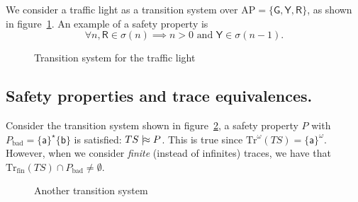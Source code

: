 \documentclass[./main]{subfiles}
\begin{document}
  \begin{exm}
    We consider a traffic light as a transition system over $\mathrm{AP} = \{\mathsf{G}, \mathsf{Y}, \mathsf{R}\}$, as shown in figure~\ref{fig:traffic-light}.
    An example of a safety property is
    \[
    \forall n, \mathsf{R} \in \sigma(n) \implies n > 0 \text{ and } \mathsf{Y} \in \sigma(n-1)
    .\] 
  \end{exm}

  \begin{figure}[b]
    \centering
    \caption{Transition system for the traffic light}
    \label{fig:traffic-light}
  \end{figure}

  \subsection{Safety properties and trace equivalences.}

  \begin{exm}
    \label{exm:two-states-ts}
    Consider the transition system shown in figure~\ref{fig:two-states-ts}, a safety property $P$ with $P_\mathrm{bad} = \{\mathsf{a}\}^\star \{\mathsf{b}\}$ is satisfied: $TS \mathrel{{|}\!{\approx}} P$. 
    This is true since $\mathrm{Tr}^\omega(TS) = \{\mathsf{a}\}^\omega$.
    However, when we consider \textit{finite} (instead of infinites) traces, we have that $\mathrm{Tr}_\mathrm{fin}(TS) \cap P_\mathrm{bad} \neq \emptyset$.
  \end{exm}

  \begin{figure}
    \centering
    \caption{Another transition system}
    \label{fig:two-states-ts}
  \end{figure}
\end{document}
